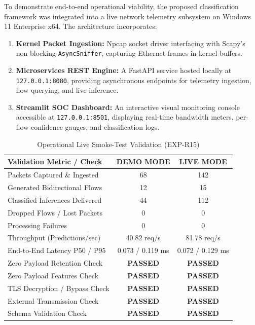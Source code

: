 \documentclass[conference]{IEEEtran}
\begin{document}
To demonstrate end-to-end operational viability, the proposed classification framework was integrated into a live network telemetry subsystem on Windows 11 Enterprise x64. The architecture incorporates:
\begin{enumerate}
    \item \textbf{Kernel Packet Ingestion:} Npcap socket driver interfacing with Scapy's non-blocking \texttt{AsyncSniffer}, capturing Ethernet frames in kernel buffers.
    \item \textbf{Microservices REST Engine:} A FastAPI service hosted locally at \texttt{127.0.0.1:8080}, providing asynchronous endpoints for telemetry ingestion, flow querying, and live inference.
    \item \textbf{Streamlit SOC Dashboard:} An interactive visual monitoring console accessible at \texttt{127.0.0.1:8501}, displaying real-time bandwidth meters, per-flow confidence gauges, and classification logs.
\end{enumerate}

\begin{table}[t]
\centering
\caption{Operational Live Smoke-Test Validation (EXP-R15)}
\label{tab:runtime_validation}
\footnotesize
\begin{tabularx}{\columnwidth}{lcc}
\toprule
\textbf{Validation Metric / Check} & \textbf{DEMO MODE} & \textbf{LIVE MODE} \\
\midrule
Packets Captured \& Ingested & 68 & 142 \\
Generated Bidirectional Flows & 12 & 15 \\
Classified Inferences Delivered & 44 & 112 \\
Dropped Flows / Lost Packets & 0 & 0 \\
Processing Failures & 0 & 0 \\
Throughput (Predictions/sec) & 40.82 req/s & 81.78 req/s \\
End-to-End Latency P50 / P95 & 0.073 / 0.119 ms & 0.072 / 0.129 ms \\
Zero Payload Retention Check & \textbf{PASSED} & \textbf{PASSED} \\
Zero Payload Features Check & \textbf{PASSED} & \textbf{PASSED} \\
TLS Decryption / Bypass Check & \textbf{PASSED} & \textbf{PASSED} \\
External Transmission Check & \textbf{PASSED} & \textbf{PASSED} \\
Schema Validation Check & \textbf{PASSED} & \textbf{PASSED} \\
\bottomrule
\end{tabularx}
\end{table}
\end{document}
